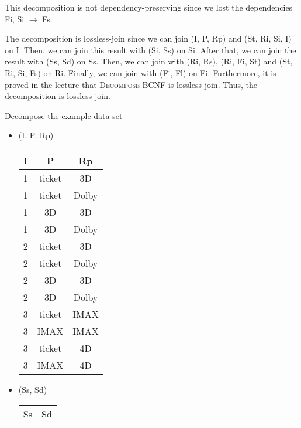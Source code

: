 \documentclass[12pt]{article}
\begin{document}
\begin{enumerate}
        This decomposition is not dependency-preserving since we lost the
        dependencies Fi, Si $\longrightarrow$ Fs.

        The decomposition is lossless-join since we can join (I, P, Rp) and (St,
        Ri, Si, I) on I. Then, we can join this result with (Si, Ss) on Si.
        After that, we can join the result with (Ss, Sd) on Ss. Then, we can
        join with (Ri, Rs), (Ri, Fi, St) and (St, Ri, Si, Fs) on Ri. Finally, we
        can join with (Fi, Fl) on Fi. Furthermore, it is proved in the lecture
        that \textsc{Decompose-BCNF} is lossless-join. Thus, the decomposition
        is lossless-join.

        Decompose the example data set
        \begin{itemize}
          \item (I, P, Rp)
                \begin{center}
                  \begin{tabular}{c c c}
                    \hline
                    I  & P      & Rp \\
                    \hline
                    1  & ticket & 3D \\
                    1  & ticket & Dolby \\
                    1  & 3D     & 3D \\
                    1  & 3D     & Dolby \\
                    2  & ticket & 3D \\
                    2  & ticket & Dolby \\
                    2  & 3D     & 3D \\
                    2  & 3D     & Dolby \\
                    3  & ticket & IMAX \\
                    3  & IMAX   & IMAX \\
                    3  & ticket & 4D \\
                    3  & IMAX   & 4D \\
                    \hline
                  \end{tabular}
                \end{center}
          \item (Ss, Sd)
                \begin{center}
                  \begin{tabular}{c c}
                    \hline
                    Ss     & Sd \\

\end{tabular}
\end{center}
\end{itemize}
\end{enumerate}
\end{document}
